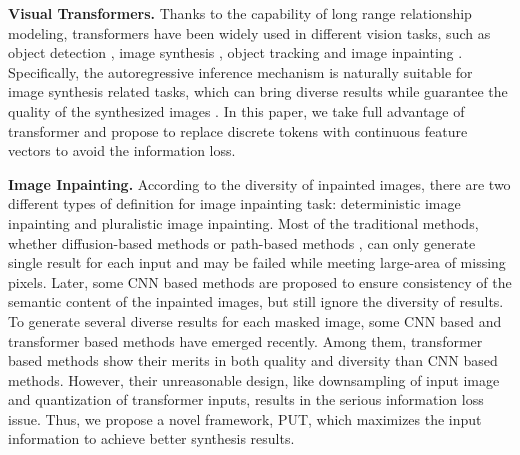 \documentclass[10pt,twocolumn,letterpaper]{article}
\begin{document}
\vspace{0.2em}
\noindent\textbf{Visual Transformers.}
Thanks to the capability of long range relationship modeling, transformers have been widely used in different vision tasks, such as object detection \cite{carion2020end, chen2021pix2seq},  image synthesis \cite{chen2020generative, esser2021taming, ramesh2021zero}, object tracking \cite{chen2021transformer, wang2021transformer} and image inpainting \cite{wan2021high}. 
Specifically, the autoregressive inference mechanism is naturally suitable for image synthesis related tasks, which can bring diverse results while guarantee the quality of the synthesized images \cite{chen2020generative,esser2021taming,ramesh2021zero,wan2021high}. In this paper, we take full advantage of transformer and propose to replace discrete tokens with continuous feature vectors to avoid the information loss.


\vspace{0.2em}
\noindent\textbf{Image Inpainting.}
According to the diversity of inpainted images, there are two different types of definition for image inpainting task: deterministic image inpainting and pluralistic image inpainting. Most of the traditional methods, whether diffusion-based methods \cite{bertalmio2000image,efros2001image} or path-based methods \cite{barnes2009patchmatch,hays2007scene,darabi2012image}, can only generate single result for each input and may be failed while meeting large-area of missing pixels. Later, some CNN based methods \cite{pathak2016context,liu2018image,liu2019coherent,yu2018generative,nazeri2019edgeconnect,iizuka2017globally} are proposed to ensure consistency of the semantic content of the inpainted images, but still ignore the diversity of results. To generate several diverse results for each masked image,  
some CNN based \cite{zheng2019pluralistic,zhao2020uctgan} and transformer based  \cite{wan2021high} methods have emerged recently. Among them, transformer based methods \cite{wan2021high} show their merits in both quality and diversity than CNN based methods.
However, their unreasonable design, like downsampling of input image and quantization of transformer inputs, results in the serious information loss issue.
Thus, we propose a novel framework, PUT, which maximizes the input information to achieve better synthesis results.
\end{document}
